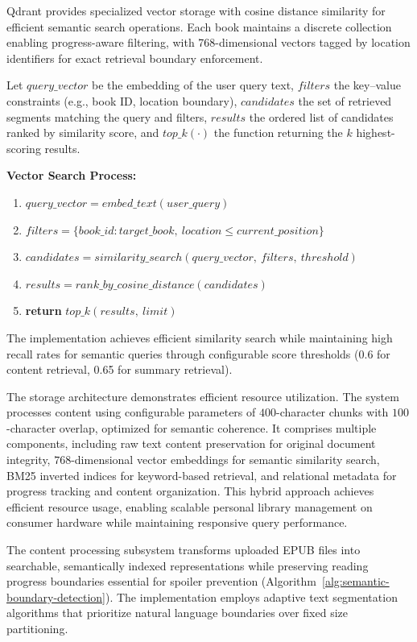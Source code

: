 Qdrant provides specialized vector storage with cosine distance similarity for efficient semantic search operations.
Each book maintains a discrete collection enabling progress-aware filtering, with 768-dimensional vectors tagged by location identifiers for exact retrieval boundary enforcement.

\noindent Let $query\_vector$ be the embedding of the user query text, $filters$ the key--value constraints (e.g., book ID, location boundary), $candidates$ the set of retrieved segments matching the query and filters, $results$ the ordered list of candidates ranked by similarity score, and $top\_k(\cdot)$ the function returning the $k$ highest-scoring results.

\noindent\textbf{Vector Search Process:}
\begin{enumerate}[leftmargin=*,nosep]
    \item $query\_vector = embed\_text(user\_query)$
    \item $filters = \{book\_id: target\_book,\ location \le current\_position\}$
    \item $candidates = similarity\_search(
    query\_vector,\ filters,\allowbreak\ threshold)$
    \item $results = rank\_by\_cosine\_distance(candidates)$
    \item \textbf{return} $top\_k(results,\ limit)$
\end{enumerate}

The implementation achieves efficient similarity search while maintaining high recall rates for semantic queries through configurable score thresholds (0.6 for content retrieval, 0.65 for summary retrieval).

The storage architecture demonstrates efficient resource utilization.
The system processes content using configurable parameters of $400$-character chunks with $100$-character overlap, optimized for semantic coherence.
It comprises multiple components, including raw text content preservation for original document integrity, $768$-dimensional vector embeddings for semantic similarity search, BM25 inverted indices for keyword-based retrieval, and relational metadata for progress tracking and content organization. 
This hybrid approach achieves efficient resource usage, enabling scalable personal library management on consumer hardware while maintaining responsive query performance.

The content processing subsystem transforms uploaded EPUB files into searchable, semantically indexed representations while preserving reading progress boundaries essential for spoiler prevention (Algorithm~\ref{alg:semantic-boundary-detection}).
The implementation employs adaptive text segmentation algorithms that prioritize natural language boundaries over fixed size partitioning.

